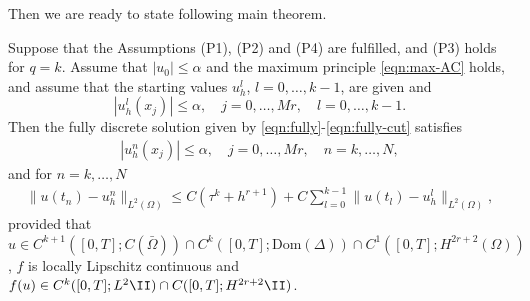 Then we are ready to state following main theorem.

\begin{theorem}\label{thm:fully-error}
Suppose that the Assumptions (P1), (P2) and (P4) are fulfilled, and (P3) holds for $q=k$.
Assume that $|u_0|\le \alpha$ and the maximum principle \eqref{eqn:max-AC} holds,
 and assume that the starting values $u_h^l$, $l=0,\dots,k-1$, are given and
$$
|u_h^l(x_j)|\le \alpha , \quad j=0,\dots,Mr,\quad l=0,\dots,k-1.
$$
Then the   {fully discrete} solution given by \eqref{eqn:fully}-\eqref{eqn:fully-cut} satisfies
\begin{align*}%
|u_h^n(x_j)|\le \alpha , \quad j=0,\dots,Mr,\quad n=k,\dots,N,
\end{align*}
and  {for $n=k,\ldots,N$}
\begin{align*}%
  \| u(t_n) - u_h^n \|_{L^2(\Omega)} \le  C(\tau^k + h^{r+1}) + C\sum_{l=0}^{k-1}\| u(t_l) - u_h^l \|_{L^2(\Omega)} ,
\end{align*}
provided that {$u\in C^{k+1}([0,T];C(\bar \Omega)) \cap C^{k}([0,T];\text{Dom}(\Delta)) \cap C^1([0,T];H^{2r+2}(\Omega))$, $f$ is locally Lipschitz continuous and $f(u)\in C^k([0,T];L^2\II)\cap C([0,T];H^{2r+2}\II)$.}
\end{theorem}

